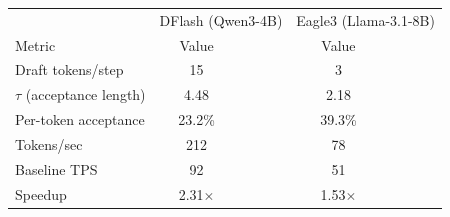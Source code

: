 \centering
\begin{tabular}{l|ccc|ccc}
\toprule
 & \multicolumn{3}{c|}{DFlash (Qwen3-4B)} & \multicolumn{3}{c}{Eagle3 (Llama-3.1-8B)} \\
Metric & Value & & & Value & & \\
\midrule
Draft tokens/step & 15 & & & 3 & & \\
$\tau$ (acceptance length) & 4.48 & & & 2.18 & & \\
Per-token acceptance & 23.2\% & & & 39.3\% & & \\
Tokens/sec & 212 & & & 78 & & \\
Baseline TPS & 92 & & & 51 & & \\
Speedup & 2.31$\times$ & & & 1.53$\times$ & & \\
\bottomrule
\end{tabular}
